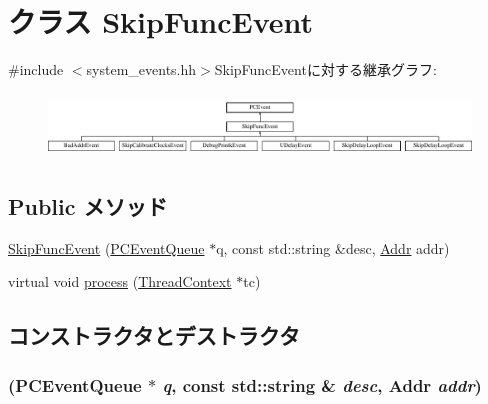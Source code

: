 \hypertarget{classSkipFuncEvent}{
\section{クラス SkipFuncEvent}
\label{classSkipFuncEvent}
}


{\ttfamily \#include $<$system\_\-events.hh$>$}SkipFuncEventに対する継承グラフ:\begin{figure}[H]
\begin{center}
\leavevmode
\includegraphics[height=1.69697cm]{classSkipFuncEvent}
\end{center}
\end{figure}
\subsection*{Public メソッド}
\begin{DoxyCompactItemize}
\item 
\hyperlink{classSkipFuncEvent_a6f2b9fcc72108cada8df8ca070487221}{SkipFuncEvent} (\hyperlink{classPCEventQueue}{PCEventQueue} $\ast$q, const std::string \&desc, \hyperlink{base_2types_8hh_af1bb03d6a4ee096394a6749f0a169232}{Addr} addr)
\item 
virtual void \hyperlink{classSkipFuncEvent_ad66a9d5ec7cfe597b848a17c0df5cc28}{process} (\hyperlink{classThreadContext}{ThreadContext} $\ast$tc)
\end{DoxyCompactItemize}


\subsection{コンストラクタとデストラクタ}
\hypertarget{classSkipFuncEvent_a6f2b9fcc72108cada8df8ca070487221}{
\subsubsection[{SkipFuncEvent}]{ ({\bf PCEventQueue} $\ast$ {\em q}, \/  const std::string \& {\em desc}, \/  {\bf Addr} {\em addr})}}
\label{classSkipFuncEvent_a6f2b9fcc72108cada8df8ca070487221}



